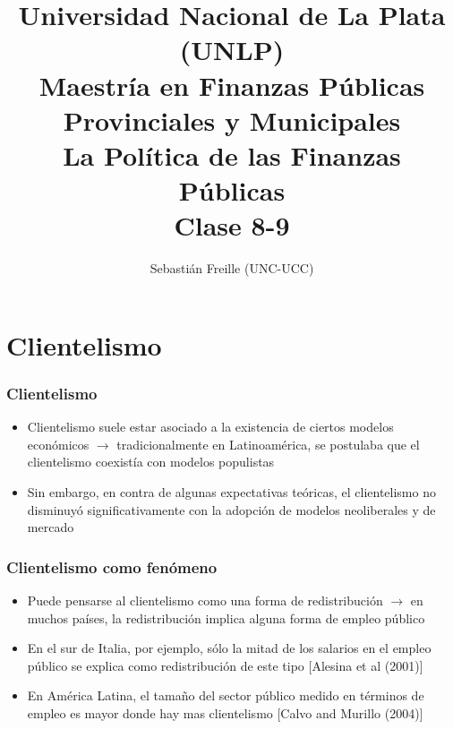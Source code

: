 \documentclass[handout,final,xcolor=dvipsnames]{beamer}
\author{Sebastián Freille (UNC-UCC)}
\title{Universidad Nacional de La Plata (UNLP) \\
  Maestría en Finanzas Públicas Provinciales y Municipales \\ La
  Política de las Finanzas Públicas \\ Clase 8-9}
\date{}
\institute{}
\begin{document}
\maketitle

\section{Clientelismo}

\begin{frame}\frametitle{Clientelismo}
  \begin{itemize}\itemsep 10pt
      \item Clientelismo suele estar asociado a la existencia de
        ciertos modelos económicos $\longrightarrow$ tradicionalmente
        en Latinoamérica, se postulaba que el clientelismo coexistía
        con modelos populistas
        \item Sin embargo, en contra de algunas expectativas teóricas,
          el clientelismo no disminuyó significativamente con la
          adopción de modelos neoliberales y de mercado
    \end{itemize}
  \end{frame}


  \begin{frame}\frametitle{Clientelismo como fenómeno}
  \begin{itemize}\itemsep 10pt
      \item Puede pensarse al clientelismo como una forma de
        redistribución $\longrightarrow$ en muchos países, la
        redistribución implica alguna forma de empleo público
        \item En el sur de Italia, por ejemplo, sólo la mitad de los
          salarios en el empleo público se explica como redistribución
          de este tipo [Alesina et al (2001)]
          \item En América Latina, el tamaño del sector público medido
            en términos de empleo es mayor donde hay mas clientelismo
            [Calvo and Murillo (2004)]
                \end{itemize}
  \end{frame}
\end{document}
